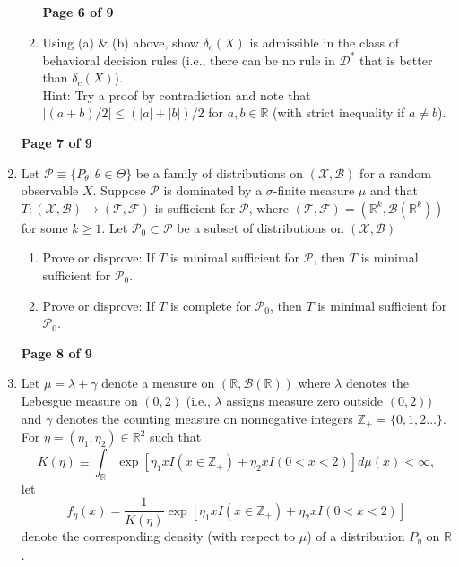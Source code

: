\documentclass[12pt]{article}
\begin{document}
\begin{enumerate}
\begin{enumerate}
\newpage
\textbf{\hspace*{1cm} \hfill Page 6 of 9}

\item  Using (a) \& (b) above, show $\delta_c(X)$ is admissible in the class
of behavioral decision rules  (i.e., there can be no rule in $\mathcal{D}^*$ that is  better than    $\delta_c(X)$).\\[.1cm]
Hint:  Try a proof by contradiction and note that $|(a+b)/2|\leq (|a|+|b|)/2$ for $a,b \in \mathbb{R}$ (with strict inequality if $a\neq b$).

\end{enumerate}


\newpage
\textbf{\hspace*{1cm} \hfill Page 7 of 9}

\item Let $\mathcal{P}\equiv \{P_\theta:\theta \in \Theta\}$ be a family of distributions on $(\mathcal{X},\mathcal{B})$ for a random observable $X$. Suppose $\mathcal{P}$ is dominated by a $\sigma$-finite measure $\mu$ and that $T:(\mathcal{X},\mathcal{B})\rightarrow (\mathcal{T},\mathcal{F})$ is  sufficient for $\mathcal{P}$, where $(\mathcal{T},\mathcal{F}) = (\mathbb{R}^k, \mathcal{B}(\mathbb{R}^k))$ for some $k\geq 1$.  Let $ \mathcal{P}_0 \subset \mathcal{P}$ be a subset of distributions on $(\mathcal{X},\mathcal{B})$

    \begin{enumerate}



\item Prove or disprove:  If $T$ is  minimal sufficient for $\mathcal{P}$, then $T$ is  minimal sufficient for $\mathcal{P}_0$.\\[4.5in]




\item Prove or disprove:  If $T$ is  complete for $\mathcal{P}_0$, then $T$ is  minimal sufficient for $\mathcal{P}_0$.


\end{enumerate}

\newpage
\textbf{\hspace*{1cm} \hfill Page 8 of 9}
\item Let $\mu=\lambda+\gamma$ denote a measure on $(\mathbb{R},\mathcal{B}(\mathbb{R}))$ where $\lambda$ denotes
the Lebesgue measure on $(0,2)$ (i.e., $\lambda$ assigns measure zero outside $(0,2)$) and $\gamma$ denotes the counting measure on nonnegative integers $\mathbb{Z}_+=\{0,1,2\ldots\}$.
 For $\eta =(\eta_1,\eta_2) \in \mathbb{R}^2$ such that
 \[
   K(\eta) \equiv \int_{\mathbb{R}} \exp\left[  \eta_1 x I(x \in \mathbb{Z}_+) + \eta_2 x I(0<x<2)  \right] d\mu(x)<\infty,
 \]
let
\[
f_\eta (x) = \frac{1}{K(\eta)}\exp\left[  \eta_1 x I(x \in \mathbb{Z}_+) + \eta_2 x I(0<x<2)  \right]
\]
denote the corresponding density (with respect to $\mu$) of a distribution $P_\eta$ on $ \mathbb{R}$.



\end{enumerate}
\end{document}
